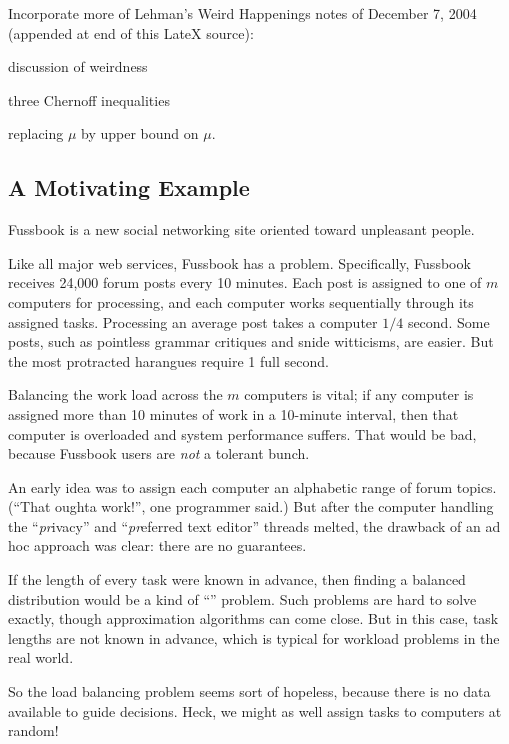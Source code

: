 \begin{editingnotes}
Incorporate more of Lehman's Weird Happenings notes of December 7,
2004 (appended at end of this LateX source):

discussion of weirdness

three Chernoff inequalities

replacing $\mu$ by upper bound on $\mu$.

\end{editingnotes}


\subsection{A Motivating Example}

Fussbook is a new social networking site oriented toward unpleasant
people.

Like all major web services, Fussbook has a  problem.
Specifically, Fussbook receives 24,000 forum posts every 10 minutes.
Each post is assigned to one of $m$ computers for processing, and each
computer works sequentially through its assigned tasks.  Processing an
average post takes a computer $1/4$ second.  Some posts, such as
pointless grammar critiques and snide witticisms, are easier.  But the
most protracted harangues require 1 full second.

Balancing the work load across the $m$ computers is vital; if any
computer is assigned more than 10 minutes of work in a 10-minute
interval, then that computer is overloaded and system performance
suffers.  That would be bad, because Fussbook users are \emph{not} a
tolerant bunch.

An early idea was to assign each computer an alphabetic range of forum
topics.  (``That oughta work!'', one programmer said.)  But after the
computer handling the ``\emph{pr}ivacy'' and ``\emph{pr}eferred text
editor'' threads melted, the drawback of an ad hoc approach was clear:
there are no guarantees.

If the length of every task were known in advance, then finding a
balanced distribution would be a kind of ``''
problem.  Such problems are hard to solve exactly, though
approximation algorithms can come close.  But in this case, task
lengths are not known in advance, which is typical for workload
problems in the real world.

So the load balancing problem seems sort of hopeless, because there is
no data available to guide decisions.  Heck, we might as well assign
tasks to computers at random!

